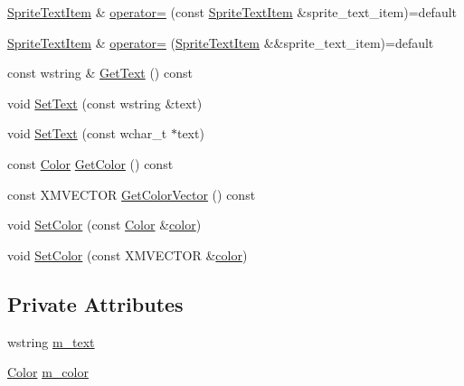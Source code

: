 \begin{DoxyCompactItemize}
\hyperlink{structmage_1_1_sprite_text_item}{Sprite\+Text\+Item} \& \hyperlink{structmage_1_1_sprite_text_item_ac0c8772b01eaa324e46dc53d08a9ea35}{operator=} (const \hyperlink{structmage_1_1_sprite_text_item}{Sprite\+Text\+Item} \&sprite\+\_\+text\+\_\+item)=default
\item 
\hyperlink{structmage_1_1_sprite_text_item}{Sprite\+Text\+Item} \& \hyperlink{structmage_1_1_sprite_text_item_aadbeeb0fb30b15675370f0b6eb65a9a2}{operator=} (\hyperlink{structmage_1_1_sprite_text_item}{Sprite\+Text\+Item} \&\&sprite\+\_\+text\+\_\+item)=default
\item 
const wstring \& \hyperlink{structmage_1_1_sprite_text_item_a5011cbf5dfb7763caa8b9516be339530}{Get\+Text} () const
\item 
void \hyperlink{structmage_1_1_sprite_text_item_a76da120ec8798b22299d7050e8f05afb}{Set\+Text} (const wstring \&text)
\item 
void \hyperlink{structmage_1_1_sprite_text_item_a702f0a51a8bf08e0d59b770d81bb2bee}{Set\+Text} (const wchar\+\_\+t $\ast$text)
\item 
const \hyperlink{structmage_1_1_color}{Color} \hyperlink{structmage_1_1_sprite_text_item_a5b98c37b46c928bacb5b82d648c0685e}{Get\+Color} () const
\item 
const X\+M\+V\+E\+C\+T\+OR \hyperlink{structmage_1_1_sprite_text_item_aa42efb6fce8dd283ee2bfb16ce459f93}{Get\+Color\+Vector} () const
\item 
void \hyperlink{structmage_1_1_sprite_text_item_ad5440a79f5f08d3fe8d4b58f69a88f3c}{Set\+Color} (const \hyperlink{structmage_1_1_color}{Color} \&\hyperlink{namespacemage_a56eceea5a9bceb2b56073f3ea4945781}{color})
\item 
void \hyperlink{structmage_1_1_sprite_text_item_a534551b3c7a135049984d19318004f82}{Set\+Color} (const X\+M\+V\+E\+C\+T\+OR \&\hyperlink{namespacemage_a56eceea5a9bceb2b56073f3ea4945781}{color})
\end{DoxyCompactItemize}
\subsection*{Private Attributes}
\begin{DoxyCompactItemize}
\item 
wstring \hyperlink{structmage_1_1_sprite_text_item_a027472334af3f1095931d238ea42cd6c}{m\+\_\+text}
\item 
\hyperlink{structmage_1_1_color}{Color} \hyperlink{structmage_1_1_sprite_text_item_a47e7057c6de9f22492b09be6c6f3a932}{m\+\_\+color}
\end{DoxyCompactItemize}


